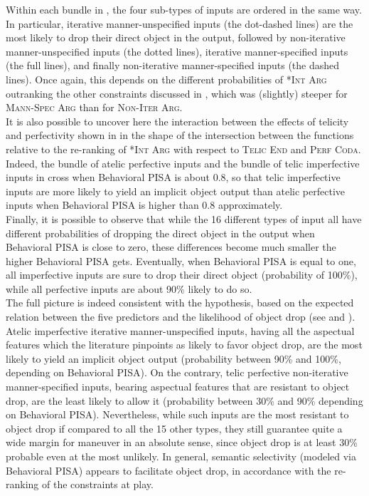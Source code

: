 Within each bundle in , the four sub-types of inputs are ordered in the same way. In particular, iterative manner-unspecified inputs (the dot-dashed lines) are the most likely to drop their direct object in the output, followed by non-iterative manner-unspecified inputs (the dotted lines), iterative manner-specified inputs (the full lines), and finally non-iterative manner-specified inputs (the dashed lines). Once again, this depends on the different probabilities of \textsc{*Int Arg} outranking the other constraints discussed in , which was (slightly) steeper for \textsc{Mann-Spec Arg} than for \textsc{Non-Iter Arg}.\\
It is also possible to uncover here the interaction between the effects of telicity and perfectivity shown in  in the shape of the intersection between the functions relative to the re-ranking of \textsc{*Int Arg} with respect to \textsc{Telic End} and \textsc{Perf Coda}. Indeed, the bundle of atelic perfective inputs and the bundle of telic imperfective inputs in  cross when Behavioral PISA is about 0.8, so that telic imperfective inputs are more likely to yield an implicit object output than atelic perfective inputs when Behavioral PISA is higher than 0.8 approximately.\\
Finally, it is possible to observe that while the 16 different types of input all have different probabilities of dropping the direct object in the output when Behavioral PISA is close to zero, these differences become much smaller the higher Behavioral PISA gets. Eventually, when Behavioral PISA is equal to one, all imperfective inputs are sure to drop their direct object (probability of 100\%), while all perfective inputs are about 90\% likely to do so.\\
The full picture is indeed consistent with the hypothesis, based on the expected relation between the five predictors and the likelihood of object drop (see  and ). Atelic imperfective iterative manner-unspecified inputs, having all the aspectual features which the literature pinpoints as likely to favor object drop, are the most likely to yield an implicit object output (probability between 90\% and 100\%, depending on Behavioral PISA). On the contrary, telic perfective non-iterative manner-specified inputs, bearing aspectual features that are resistant to object drop, are the least likely to allow it (probability between 30\% and 90\% depending on Behavioral PISA). Nevertheless, while such inputs are the most resistant to object drop if compared to all the 15 other types, they still guarantee quite a wide margin for maneuver in an absolute sense, since object drop is at least 30\% probable even at the most unlikely. In general, semantic selectivity (modeled via Behavioral PISA) appears to facilitate object drop, in accordance with the re-ranking of the constraints at play.


